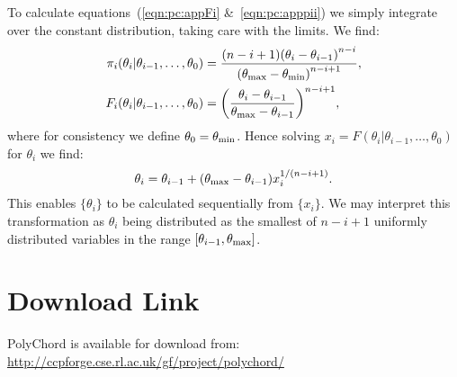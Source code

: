 To calculate equations~(\ref{eqn:pc:appFi} \&~\ref{eqn:pc:apppii}) we simply integrate over the constant distribution, taking care with the limits. We find:
\begin{align}
  \pi_i(\theta_i|\theta_{i-1},\ldots,\theta_0) &= \frac{(n-i+1){(\theta_i-\theta_{i-1})}^{n-i}}{{(\theta_{\mathrm{max}}-\theta_{\mathrm{min}})}^{n-i+1}},\\
  F_i(\theta_i|\theta_{i-1},\ldots,\theta_0) &= {\left(\frac{\theta_i-\theta_{i-1}}{\theta_{\mathrm{max}}-\theta_{i-1}}\right)}^{n-i+1},
  \label{eqn:pc:sorted_uniform_calc}
\end{align}
where for consistency we define $\theta_0 = \theta_{\mathrm{min}}$. Hence solving $x_i=F(\theta_i|\theta_{i-1},\ldots,\theta_0)$ for $\theta_i$ we find:
\begin{equation}
  \theta_i = \theta_{i-1}+ (\theta_{\mathrm{max}}-\theta_{i-1})x_i^{1/(n-i+1)}.
  \label{eqn:pc:sorted_uniform_trans}
\end{equation}
This enables $\{\theta_i\}$ to be calculated sequentially from $\{x_i\}$. We may interpret this transformation as $\theta_i$ being distributed as the smallest of $n-i+1$ uniformly distributed variables in the range $[\theta_{i-1},\theta_{\mathrm{max}}]$.







\section*{Download Link}
PolyChord is available for download from:\\ \url{http://ccpforge.cse.rl.ac.uk/gf/project/polychord/}


